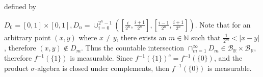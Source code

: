 \documentclass[12pt, letterpaper]{article}
\newcommand{\N}{\mathbb{N}}
\newcommand{\R}{\mathbb{R}}
\begin{document}
\begin{enumerate}
\begin{enumerate}
		defined by 		
		
		$D_0 = [0,1]\times [0,1], D_n = 
		\cup_{i=0}^{2^n-1} ([\frac{i}{2^n},
		\frac{i+1}{2^{n}}],[\frac{i-1}{2^n},\frac{i+1}{2^{n}}])$.
		Note that for an arbitrary point $(x,y)$ where $x \neq y$, there exists an 
		$m \in \N$ such that $\frac{1}{2^m} < |x-y|$, therefore $(x,y) \not \in D_m$.
		Thus the countable intersection $\cap_{m=1}^\infty D_m \in \mathcal{B}_{\R} \times \mathcal{B}_{\R}$, therefore $f^{-1}(\{1\})$ is measurable.  Since $f^{-1}(\{1\})^c = f^{-1}(\{0\})$, and the product $\sigma$-algebra is closed 
		under complements,
		then $f^{-1}(\{0\})$ is measurable. 
				

		

\end{enumerate}
\end{enumerate}
\end{document}
